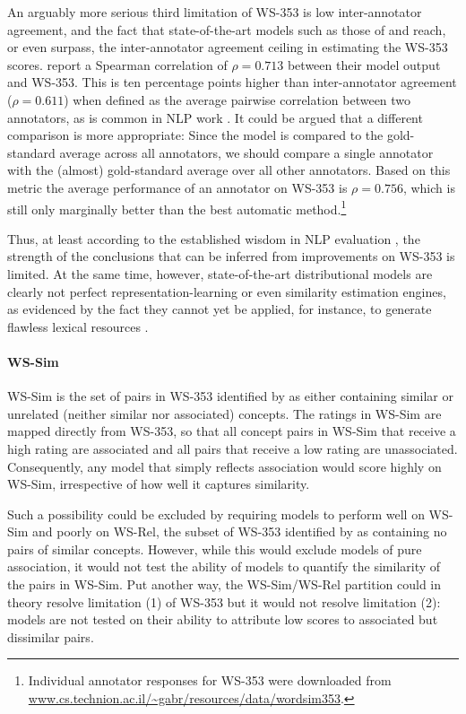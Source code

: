 An arguably more serious third limitation of WS-353 is low inter-annotator agreement, and the fact that state-of-the-art models such as those of \cite{collobert2008unified} and \cite{huang2012improving} reach, or even surpass, the inter-annotator agreement ceiling in estimating the WS-353 scores. \cite{huang2012improving} report a Spearman correlation of \(\rho = 0.713\) between their model output and WS-353. This is ten percentage points higher than inter-annotator agreement (\(\rho = 0.611\)) when defined as the average pairwise correlation between two annotators, as is common in NLP work \cite{pado2007flexible,reisinger2010mixture,silberer2014learning}. It could be argued that a different comparison is more appropriate: Since the model is compared to the gold-standard average across all annotators, we should compare a single annotator with the (almost) gold-standard average over all other annotators. Based on this metric the average performance of an annotator on WS-353 is  \( \rho=0.756 \), which is still only marginally better than the best automatic method.\footnote{Individual annotator responses for WS-353 were downloaded from \url{www.cs.technion.ac.il/~gabr/resources/data/wordsim353}.}  

Thus, at least according to the established wisdom in NLP evaluation \cite{yong1999case,cunningham2005information,resnik201011}, the strength of the conclusions that can be inferred from improvements on WS-353 is limited. At the same time, however, state-of-the-art distributional models are clearly not perfect representation-learning or even similarity estimation engines, as evidenced by the fact they cannot yet be applied, for instance, to generate flawless lexical resources \cite{alfonseca2002extending}. 

\paragraph{\bf WS-Sim} WS-Sim is the set of pairs in WS-353 identified by \cite{agirre2009study} as either containing similar or unrelated (neither similar nor associated) concepts. The ratings in WS-Sim are mapped directly from WS-353, so that all concept pairs in WS-Sim that receive a high rating are associated and all pairs that receive a low rating are unassociated. Consequently, any model that simply reflects association would score highly on WS-Sim, irrespective of how well it captures similarity. 

Such a possibility could be excluded by requiring models to perform well on WS-Sim and poorly on WS-Rel, the subset of WS-353 identified by \cite{agirre2009study} as containing no pairs of similar concepts. However, while this would exclude models of pure association, it would not test the ability of models to quantify the similarity of the pairs in WS-Sim. Put another way, the WS-Sim/WS-Rel partition could in theory resolve limitation (1) of WS-353 but it would not resolve limitation (2): models are not tested on their ability to attribute low scores to associated but dissimilar pairs. 


